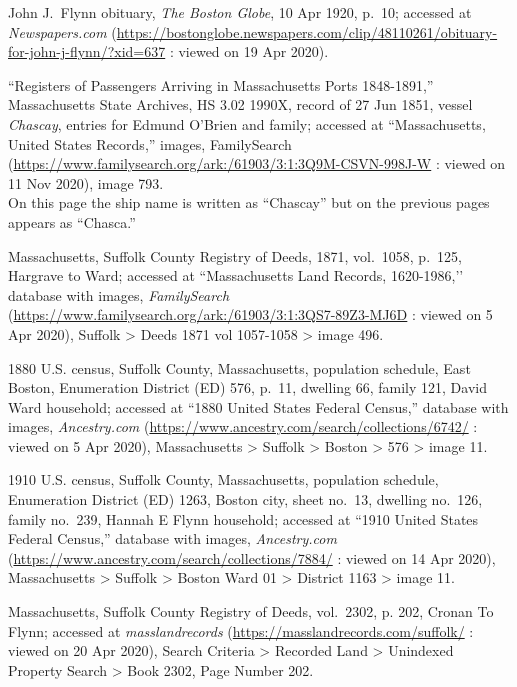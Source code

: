 \begin{thebibliography}{999}
John J.\ Flynn obituary, \textit{The Boston Globe}, 10 Apr 1920, p.\ 10; accessed at \textit{Newspapers.com} (\url{https://bostonglobe.newspapers.com/clip/48110261/obituary-for-john-j-flynn/?xid=637} : viewed on 19 Apr 2020).

``Registers of Passengers Arriving in Massachusetts Ports 1848-1891,'' Massachusetts State Archives, HS 3.02 1990X, record of 27 Jun 1851, vessel \textit{Chascay}, entries for Edmund O'Brien and family; accessed at ``Massachusetts, United States Records,'' images, FamilySearch (\url{https://www.familysearch.org/ark:/61903/3:1:3Q9M-CSVN-998J-W} : viewed on 11 Nov 2020), image 793.\\
On this page the ship name is written as ``Chascay'' but on the previous pages appears as ``Chasca.''

Massachusetts, Suffolk County Registry of Deeds, 1871, vol.\ 1058, p.\ 125, Hargrave to Ward; accessed at ``Massachusetts Land Records, 1620-1986,’’ database with images, \textit{FamilySearch} (\url{https://www.familysearch.org/ark:/61903/3:1:3QS7-89Z3-MJ6D} : viewed on 5 Apr 2020), Suffolk > Deeds 1871 vol 1057-1058 > image 496.

1880 U.S. census, Suffolk County, Massachusetts, population schedule, East Boston, Enumeration District (ED) 576, p.\ 11, dwelling 66, family 121, David Ward household; accessed at ``1880 United States Federal Census,'' database with images, \textit{Ancestry.com} (\url{https://www.ancestry.com/search/collections/6742/} : viewed on 5 Apr 2020), Massachusetts > Suffolk > Boston > 576 > image 11.

1910 U.S. census, Suffolk County, Massachusetts, population schedule, Enumeration District (ED) 1263, Boston city, sheet no.\ 13, dwelling no.\ 126, family no.\ 239, Hannah E Flynn household; accessed at ``1910 United States Federal Census,'' database with images, \textit{Ancestry.com} (\url{https://www.ancestry.com/search/collections/7884/} : viewed on 14 Apr 2020), Massachusetts > Suffolk > Boston Ward 01 > District 1163 > image 11.

Massachusetts, Suffolk County Registry of Deeds, vol.\ 2302, p. 202, Cronan To Flynn; accessed at \textit{masslandrecords} (\url{https://masslandrecords.com/suffolk/} : viewed on 20 Apr 2020), Search Criteria > Recorded Land > Unindexed Property Search > Book 2302, Page Number 202.


\end{thebibliography}
